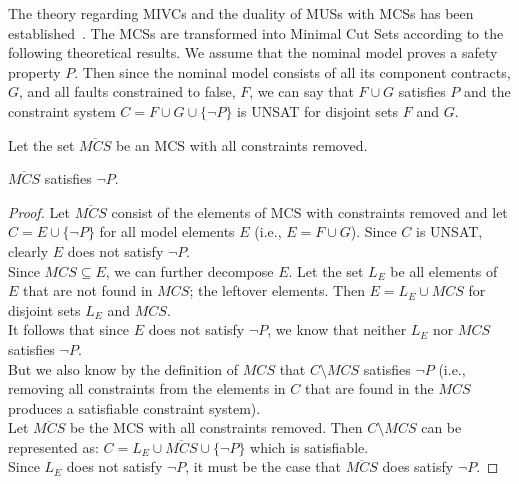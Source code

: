 The theory regarding MIVCs and the duality of MUSs with MCSs has been established~\cite{GhassabaniGW16,Ghassabani2017EfficientGO,liffiton2016fast}. The MCSs are transformed into Minimal Cut Sets according to the following theoretical results. We assume that the nominal model proves a safety property $P$. Then since the nominal model consists of all its component contracts, $G$, and all faults constrained to false, $F$, we can say that $F \cup G$ satisfies $P$ and the constraint system $C = F \cup G \cup \{\neg P\}$ is UNSAT for disjoint sets $F$ and $G$.

Let the set $\overline{MCS}$ be an MCS with all constraints removed.

\begin{lemma}
$\overline{MCS}$ satisfies $\neg P$.

\begin{proof}
Let $\overline{MCS}$ consist of the elements of MCS with constraints removed and let $C = E \cup \{\neg P\}$ for all model elements $E$ (i.e., $E = F \cup G$). Since $C$ is UNSAT, clearly $E$ does not satisfy $\neg P$. \\

Since $MCS \subseteq E$, we can further decompose $E$. Let the set $L_E$ be all elements of $E$ that are not found in $MCS$; the leftover elements. Then $E = L_E \cup MCS$ for disjoint sets $L_E$ and $MCS$. \\

It follows that since $E$ does not satisfy $\neg P$, we know that neither $L_E$ nor $MCS$ satisfies $\neg P$.\\ 

But we also know by the definition of $MCS$ that $C \setminus MCS$ satisfies $\neg P$ (i.e., removing all constraints from the elements in $C$ that are found in the $MCS$ produces a satisfiable constraint system). \\

Let $\overline{MCS}$ be the MCS with all constraints removed. Then $C \setminus MCS$ can be represented as: $C = L_E \cup \overline{MCS} \cup \{\neg P\}$ which is satisfiable. \\

Since $L_E$ does not satisfy $\neg P$, it must be the case that $\overline{MCS}$ does satisfy $\neg P$.

\end{proof}
\label{lem:minCorrSet1}
\end{lemma}
\vspace{-2em}

